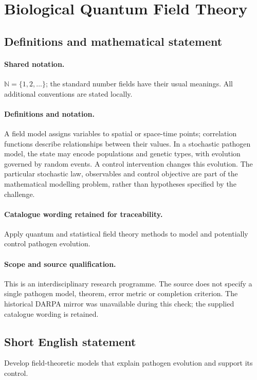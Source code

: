\documentclass[11pt]{article}
\begin{document}
\section{Biological Quantum Field Theory}\label{statement}

\subsection{Definitions and mathematical statement}

\paragraph{Shared notation.}$\mathbb N=\{1,2,\ldots\}$; the standard number fields have their usual meanings. All additional conventions are stated locally.


\paragraph{Definitions and notation.}A field model assigns variables to spatial or space-time points; correlation functions describe relationships between their values. In a stochastic pathogen model, the state may encode populations and genetic types, with evolution governed by random events. A control intervention changes this evolution. The particular stochastic law, observables and control objective are part of the mathematical modelling problem, rather than hypotheses specified by the challenge.

\paragraph{Catalogue wording retained for traceability.}
Apply quantum and statistical field theory methods to model and potentially control pathogen evolution.
\paragraph{Scope and source qualification.}This is an interdisciplinary research programme. The source does not specify a single pathogen model, theorem, error metric or completion criterion. The historical DARPA mirror was unavailable during this check; the supplied catalogue wording is retained.
\subsection{Short English statement}
Develop field-theoretic models that explain pathogen evolution and support its control.
\end{document}
